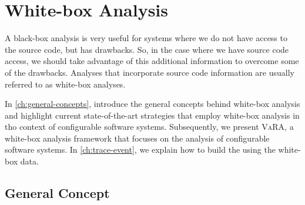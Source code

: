 



\section{White-box Analysis}\label{ch:Whitebox}
A black-box analysis is very useful for systems where we do not have access to the source code, but has drawbacks.
So, in the case where we have source code access, we should take advantage of this additional information to overcome some of the drawbacks.
Analyses that incorporate source code information are usually referred to as white-box analyses. 

In \autoref{ch:general-concepts}, introduce the general concepts behind white-box analysis and 
highlight current state-of-the-art strategies that employ white-box analysis in tho context of configurable software systems.
Subsequently, we present \textsc{VaRA}, a white-box analysis framework that focuses on the analysis of configurable software systems. 
In \autoref{ch:trace-event}, we explain how to build the {\perfInfluenceModel} using the white-box data.

\subsection{General Concept}\label{wb:general-concept}

